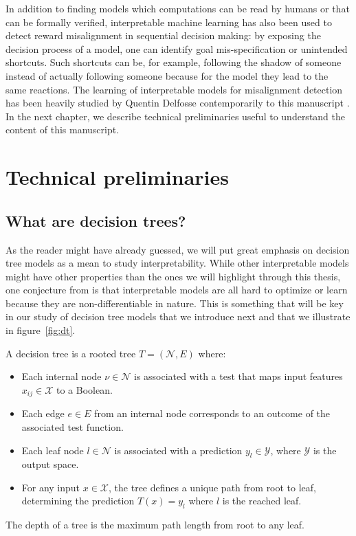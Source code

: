 In addition to finding models which computations can be read by humans or that can be formally verified, interpretable machine learning has also been used to detect reward misalignment in sequential decision making: by exposing the decision process of a model, one can identify goal mis-specification or unintended shortcuts.
Such shortcuts can be, for example, following the shadow of someone instead of actually following someone because for the model they lead to the same reactions.
The learning of interpretable models for misalignment detection has been heavily studied by Quentin Delfosse contemporarily to this manuscript \cite{scobots,shindo2024blendrl,nudge,ocatari}.
In the next chapter, we describe technical preliminaries useful to understand the content of this manuscript.

\chapter*{Technical preliminaries}\label{sec:technicals}

\section{What are decision trees?}\label{sec:dt}

As the reader might have already guessed, we will put great emphasis on decision tree models as a mean to study interpretability.
While other interpretable models might have other properties than the ones we will highlight through this thesis, one conjecture from \cite{glanois-survey} is that interpretable models are all hard to optimize or learn because they are non-differentiable in nature.
This is something that will be key in our study of decision tree models that we introduce next and that we illustrate in figure~\ref{fig:dt}.

\begin{definition}\label{def:dt}
    A decision tree is a rooted tree $T = (\mathcal{N}, E)$ where:
    \begin{itemize}
    \item Each internal node $\nu \in \mathcal{N}$ is associated with a test that maps input features $x_{ij} \in \mathcal{X}$ to a Boolean.
    \item Each edge $e \in E$ from an internal node corresponds to an outcome of the associated test function.
    \item Each leaf node $l \in \mathcal{N}$ is associated with a prediction $y_l \in \mathcal{Y}$, where $\mathcal{Y}$ is the output space.
    \item For any input $x \in \mathcal{X}$, the tree defines a unique path from root to leaf, determining the prediction $T(x) = y_l$ where $l$ is the reached leaf.
    \end{itemize}
    The depth of a tree is the maximum path length from root to any leaf.
    \end{definition}

